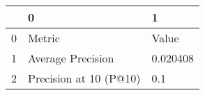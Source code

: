 \begin{tabular}{lll}
\toprule
{} &                       0 &         1 \\
\midrule
0 &                  Metric &     Value \\
1 &       Average Precision &  0.020408 \\
2 &  Precision at 10 (P@10) &       0.1 \\
\bottomrule
\end{tabular}
